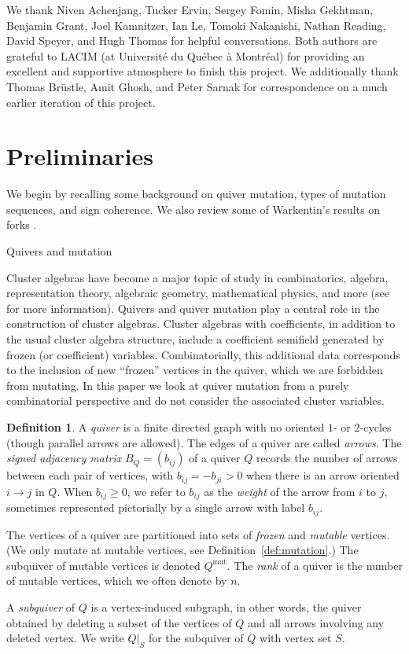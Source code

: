 \documentclass[12pt]{amsart}
\makeatletter
\theoremstyle{definition}
\newtheorem{defn}[thm]{Definition}
\theoremstyle{remark}
\numberwithin{equation}{section}
\newcommand{\mut} {\text{mut}}
\def\subsection{\@startsection{subsection}{3}%
  \z@{.5\linespacing\@plus.7\linespacing}{.1\linespacing}%
  {\bfseries}}
\makeatother
\begin{document}
We thank Niven Achenjang, Tucker Ervin, Sergey Fomin, Misha Gekhtman, Benjamin Grant, Joel Kamnitzer, Ian Le, Tomoki Nakanishi, Nathan Reading, David Speyer, and Hugh Thomas for helpful conversations. 
Both authors are grateful to LACIM (at Universit\'e du Qu\'ebec \`a Montr\'eal) for providing an excellent and supportive atmosphere to finish this project. We additionally thank Thomas Br\"ustle, Amit Ghosh, and Peter Sarnak for correspondence on a much earlier iteration of this project.



\section{Preliminaries}
\label{sec: prelim}

We begin by recalling some background on quiver mutation, types of mutation sequences, and sign coherence.  We also review some of Warkentin's results on forks  \cite{Warkentin}. 


\subsection{Quivers and mutation}

Cluster algebras have become a major topic of study in combinatorics, algebra, representation theory, algebraic geometry, mathematical physics, and more (see \cite{FWZ} for more information). Quivers and quiver mutation play a central role in the construction of cluster algebras.  Cluster algebras with coefficients, in addition to the usual cluster algebra structure, include a coefficient semifield generated by frozen (or coefficient) variables.  Combinatorially, this additional data corresponds to the inclusion of new ``frozen'' vertices in the quiver, which we are forbidden from mutating.  In this paper we look at quiver mutation from a purely combinatorial perspective and do not consider the associated cluster variables.

\begin{defn}
A \emph{quiver} is a finite directed graph with no oriented $1$- or $2$-cycles (though parallel arrows are allowed).
The edges of a quiver are called \emph{arrows}.
The \emph{signed adjacency matrix} $B_Q = (b_{ij})$ of a quiver $Q$ records the number of arrows between each pair of vertices, with $b_{ij} = -b_{ji} >0$ when there is an arrow oriented $i \rightarrow j$ in $Q$. When $b_{ij} \geq 0$, we refer to $b_{ij}$ as the \emph{weight} of the arrow from $i$ to $j$, sometimes represented pictorially by a single arrow with label $b_{ij}$.

The vertices of a quiver are partitioned into sets of \emph{frozen} and \emph{mutable} vertices. (We only mutate at mutable vertices, see Definition~\ref{def:mutation}.) The subquiver of mutable vertices is denoted $Q^{\mut}$. 
The \emph{rank} of a quiver is the number of mutable vertices, which we often denote by $n$.

A \emph{subquiver} of $Q$ is a vertex-induced subgraph, in other words, the quiver obtained by deleting a subset of the vertices of $Q$ and all arrows involving any deleted vertex. We write $Q|_S$ for the subquiver of $Q$ with vertex set $S$.
\end{defn}
\end{document}
